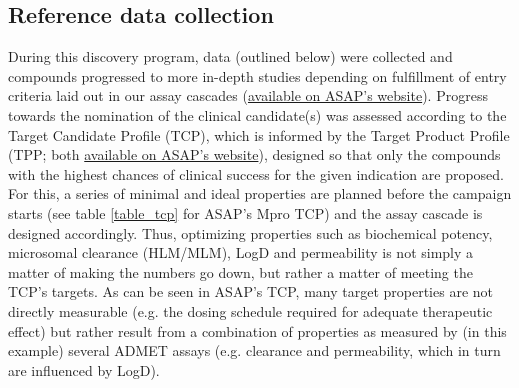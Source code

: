\documentclass[journal=jcim,manuscript=article]{achemso}
\begin{document}
\subsection{Reference data collection}
During this discovery program, data (outlined below) were collected and compounds progressed to more in-depth studies depending on fulfillment of entry criteria laid out in our assay cascades (\href{https://docs.google.com/presentation/d/10tZJvEqpkakq5clvJMawdOTHxPMgimjU7zd0AW11bCg/edit?slide=id.g232fd5f2809_1_114#slide=id.g232fd5f2809_1_114}{available on ASAP's website}). Progress towards the nomination of the clinical candidate(s) was assessed according to the Target Candidate Profile (TCP), which is informed by the Target Product Profile (TPP; both \href{https://docs.google.com/presentation/d/1udzDw0Yo2DQkJcpVpm1jn7rwRpoRvmH_pcXGSl2ztp0/edit?slide=id.g36e536f4044_0_0#slide=id.g36e536f4044_0_0}{available on ASAP's website}), designed so that only the compounds with the highest chances of clinical success for the given indication are proposed. For this, a series of minimal and ideal properties are planned before the campaign starts (see table \ref{table_tcp} for ASAP's Mpro TCP) and the assay cascade is designed accordingly. Thus, optimizing properties such as biochemical potency, microsomal clearance (HLM/MLM), LogD and permeability is not simply a matter of making the numbers go down, but rather a matter of meeting the TCP's targets. As can be seen in ASAP's TCP, many target properties are not directly measurable (e.g. the dosing schedule required for adequate therapeutic effect) but rather result from a combination of properties as measured by (in this example) several ADMET assays (e.g. clearance and permeability, which in turn are influenced by LogD). 
\end{document}
